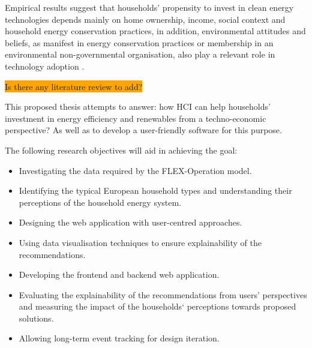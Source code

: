Empirical results suggest that households' propensity to invest in clean energy technologies depends mainly on home ownership, income, social context and household energy conservation practices,
in addition, environmental attitudes and beliefs, as manifest in energy conservation practices or membership in an environmental non-governmental organisation, also play a relevant role in technology adoption \cite{determinants}.

\colorbox{orange}{Is there any literature review to add?}

This proposed thesis attempts to answer:  
how HCI can help households' investment in energy efficiency and renewables
from a techno-economic perspective? 
As well as to develop a user-friendly software for this purpose. 

The following research objectives will aid in achieving the goal: 

\begin{itemize}
  \item Investigating the data required by the FLEX-Operation model. 
  \item Identifying the typical European household types and understanding their perceptions of the household energy system. 
  \item Designing the web application with user-centred approaches. 
  \item Using data visualisation techniques to ensure explainability of the recommendations. 
  \item Developing the frontend and backend web application. 
  \item Evaluating the explainability of the recommendations from users' perspectives and measuring the impact of the households‘ perceptions towards proposed solutions. 
  \item Allowing long-term event tracking for design iteration. 
\end{itemize}




